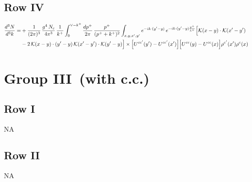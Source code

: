\documentclass[9pt]{article}
\numberwithin{equation}{section}
\begin{document}
\subsection{Row IV}
\begin{align}
\frac{d^{3}N}{d^{3}k}= &  +\frac{1}{(2\pi)^{3}}\,\frac{g^{4}\,N_{c}}{4\pi^{3}}\,\frac{1}{k^{+}}\int_{0}^{\vee-k^{+}}\frac{dp^{+}}{2\pi}\,\frac{p^{+}}{(p^{+}+k^{+})^{2}}\int_{x,y,x',y'}e^{-ik\cdot(y'-y)}\,e^{-ik\cdot(y'-y)\frac{p^{+}}{k^{+}}}\Big[\mathcal{K}(x-y)\cdot\mathcal{K}(x'-y')\notag \\ & -2\,\mathcal{K}(x-y)\cdot(y'-y)\,\mathcal{K}(x'-y')\cdot\mathcal{K}(y'-y)\Big]\times\Big[U^{ce'}(y') - U^{ce'}(x')\Big]\Big[U^{ce}(y) - U^{ce}(x)\Big]\rho^{e'}(x')\rho^{e}(x)
\end{align}
\section{Group III\, (with c.c.)}
\subsection{Row I}
\textsc{NA}
\subsection{Row II}
\textsc{NA}
\end{document}
